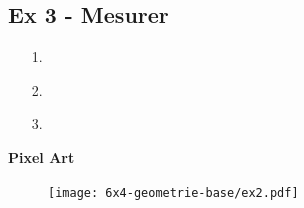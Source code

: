 \subsection*{Ex 3 - Mesurer}
\begin{minipage}[t]{0.50\textwidth}
\begin{enumerate}
  \item[1.] \dotfill \\
  \item[2.] \dotfill \\
  \item[3.] \dotfill \\
\end{enumerate}
\textbf{Pixel Art}
\end{minipage}
\begin{minipage}[t]{0.50\textwidth}
  \begin{figure}[H]
    \centering
    \texttt{[image: 6x4-geometrie-base/ex2.pdf]}
  \end{figure}
\end{minipage}

